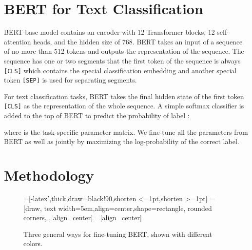 \documentclass[11pt,a4paper]{article}
\theoremstyle{definition}
\begin{document}
\begin{CJK*}{UTF8}{gbsn}
\section{BERT for Text Classification}

BERT-base model contains an encoder with 12 Transformer blocks, 12 self-attention heads, and the hidden size of 768. BERT takes an input of a sequence of no more than 512 tokens and outputs the representation of the sequence. The sequence has one or two segments that the first token of the sequence is always \texttt{[CLS]} which contains the special classification embedding and another special token \texttt{[SEP]} is used for separating segments.
	
For text classification tasks, BERT takes the final hidden state  of the first token \texttt{[CLS]} as the representation of the whole sequence. A simple softmax classifier is added to the top of BERT to predict the probability of label :

where  is the task-specific parameter matrix. We fine-tune all the parameters from BERT as well as  jointly by maximizing the log-probability of the correct label.
	
\section{Methodology}

\begin{figure}
  \centering

  =[-latex',thick,draw=black!90,shorten <=1pt,shorten >=1pt]
=[draw, text width=5em,align=center,shape=rectangle, rounded corners, , align=center]
  =[align=center]

	  \caption{Three general ways for fine-tuning BERT, shown with different colors.}\label{fig:arch}
\end{figure}


\end{CJK*}
\end{document}
